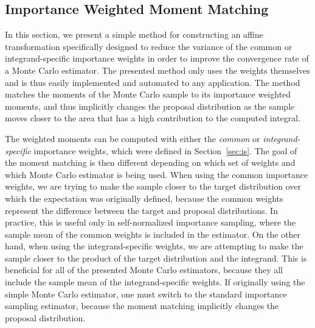 \documentclass[12pt]{article}
\begin{document}
%
\subsection{Importance Weighted Moment Matching} \label{sec:trans}



In this section, we present a simple method for constructing an affine transformation
specifically designed to reduce the variance of
the common or integrand-specific importance weights in order to improve the convergence rate of a Monte Carlo estimator.
The presented method only uses the weights themselves
and is thus easily implemented and automated to any application.
The method matches the moments of the Monte Carlo sample
to its importance weighted moments, and thus
implicitly changes the proposal distribution as
the sample moves closer to the area that has a high contribution to
the computed integral.



The weighted moments can be computed with either the 
\emph{common} or \emph{integrand-specific}
importance weights, which were defined in Section~\ref{sec:is}.
The goal of the moment matching is then different depending on
which set of weights and which Monte Carlo estimator is being used.
When using the common importance weights, we are trying to make
the sample closer to the target distribution over which the 
expectation was originally defined, because
the common weights represent the difference between
the target and proposal distributions.
In practice, this is useful only in self-normalized importance sampling, where
the sample mean of the common weights is included in the estimator.
On the other hand, when using the integrand-specific weights, we are
attempting to make the sample closer to the product of
the target distribution and the integrand.
This is beneficial for all of the presented Monte Carlo estimators, because they
all include the sample mean of the integrand-specific weights.
If originally using the simple Monte Carlo estimator, one must switch
to the standard importance sampling estimator, because
the moment matching implicitly changes the proposal distribution.
\end{document}
